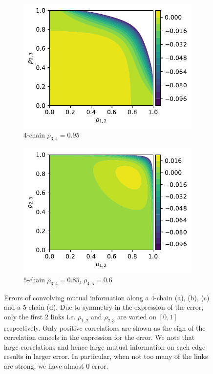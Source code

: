 \documentclass[../Thesis.tex]{subfiles}
\begin{document}
\begin{figure}[h]
    \begin{subfigure}[t]{0.49\textwidth}
        \centering
        \includegraphics[width=.95\linewidth]{figures/Gaussian Chain Theoretical/3 chain error - MI - rho3 0_95.pdf}
        \caption{$4$-chain $\rho_{3,4} = 0.95$}
    \end{subfigure}
    \hfill
    \begin{subfigure}[t]{0.49\textwidth}
        \centering
        \includegraphics[width=.95\linewidth]{figures/Gaussian Chain Theoretical/4 chain error - MI - rho3 0_85 rho4 0_6.pdf}
        \caption{$5$-chain $\rho_{3,4} = 0.85$, $\rho_{4,5} = 0.6$}
        \label{subfig:Gaussian 5 chain MI error}
    \end{subfigure}
    \caption{Errors of convolving mutual information along a $4$-chain (a), (b), (c) and a $5$-chain (d). Due to symmetry in the expression of the error, only the first $2$ links i.e. $\rho_{1,2}$ and $\rho_{2,3}$ are varied on $[0,1]$ respectively. Only positive correlations are shown as the sign of the correlation cancels in the expression for the error. We note that large correlations and hence large mutual information on each edge results in larger error. In particular, when not too many of the links are strong, we have almost $0$ error.}
    \label{fig:3 and 4 chain MI error}
\end{figure}
\end{document}
